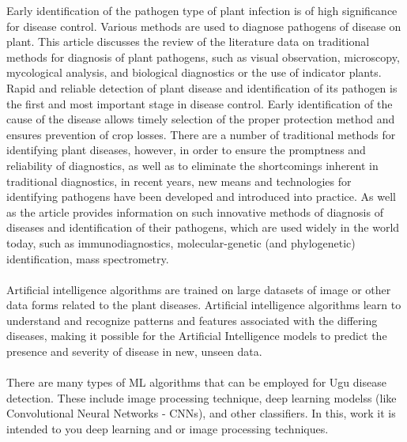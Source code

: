 Early identification of the pathogen type of plant infection is of high significance for disease control. Various methods are used to diagnose pathogens of disease on plant. This article discusses the review of the literature data on traditional methods for diagnosis of plant pathogens, such as visual observation, microscopy, mycological analysis, and biological diagnostics or the use of indicator plants. Rapid and reliable detection of plant disease and identification of its pathogen is the first and most important stage in disease control. Early identification of the cause of the disease allows timely selection of the proper protection method and ensures prevention of crop losses. There are a number of traditional methods for identifying plant diseases, however, in order to ensure the promptness and reliability of diagnostics, as well as to eliminate the shortcomings inherent in traditional diagnostics, in recent years, new means and technologies for identifying pathogens have been developed and introduced into practice. As well as the article provides information on such innovative methods of diagnosis of diseases and identification of their pathogens, which are used widely in the world today, such as immunodiagnostics, molecular-genetic (and phylogenetic) identification, mass spectrometry. \citep{Khakimov_2022}


\paragraph*{} Artificial intelligence algorithms are trained on large datasets of image or other data forms related to the plant diseases. Artificial intelligence algorithms learn to understand and recognize patterns and features associated with the differing diseases, making it possible for the Artificial Intelligence models to predict the presence and severity of disease in new, unseen data.

\paragraph*{} There are many types of ML algorithms that can be employed for Ugu disease detection. These include image processing technique, deep learning modelss (like Convolutional Neural Networks - CNNs), and other classifiers. In this, work it is intended to you deep learning and or image processing techniques. 

